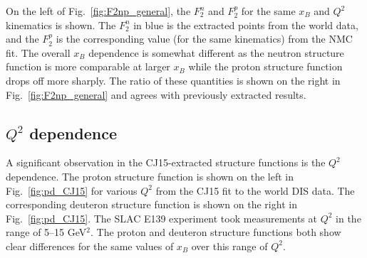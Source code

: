 \documentclass[oneside]{article}
\begin{document}
On the left of Fig.~\ref{fig:F2np_general}, the $F_2^n$ and $F_2^p$ for the same $x_B$ and $Q^2$ kinematics is shown. The $F_2^n$ in blue is the extracted points from the world data, and the $F_2^p$ is the corresponding value (for the same kinematics) from the NMC fit. The overall $x_B$ dependence is somewhat different as the neutron structure function is more comparable at larger $x_B$ while the proton structure function drops off more sharply. The ratio of these quantities is shown on the right in Fig.~\ref{fig:F2np_general} and agrees with previously extracted results. %
 
\subsection{$Q^2$ dependence}

A significant observation in the CJ15-extracted structure functions is the $Q^2$ dependence. The proton structure function is shown on the left in Fig.~\ref{fig:pd_CJ15} for various $Q^2$ from the CJ15 fit to the world DIS data. The corresponding deuteron structure function is shown on the right in Fig.~\ref{fig:pd_CJ15}. The SLAC E139 experiment took measurements at $Q^2$ in the range of 5--15 GeV$^2$. The proton and deuteron structure functions both show clear differences for the same values of $x_B$ over this range of $Q^2$. 
\end{document}

